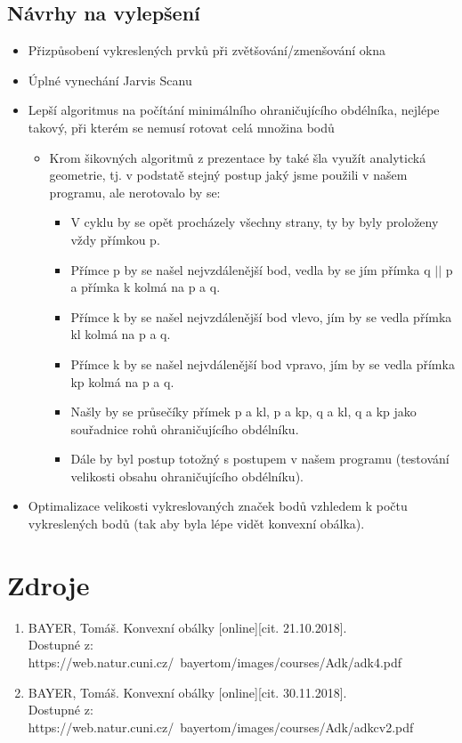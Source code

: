 \documentclass[a4paper, 12pt]{article}
\begin{document}
\subsection{Návrhy na vylepšení}
\begin{itemize}
	\item Přizpůsobení vykreslených prvků při zvětšování/zmenšování okna
	\item Úplné vynechání Jarvis Scanu
	\item Lepší algoritmus na počítání minimálního ohraničujícího obdélníka, nejlépe takový, při kterém se nemusí rotovat celá množina bodů
		\begin{itemize}
			\item Krom šikovných algoritmů z prezentace by také šla využít analytická geometrie, tj. v podstatě stejný postup jaký jsme použili v našem programu, ale nerotovalo by se:
				\begin{itemize}
					\item V cyklu by se opět procházely všechny strany, ty by byly proloženy vždy přímkou p. 
					\item Přímce p by se našel nejvzdálenější bod, vedla by se jím přímka q $||$ p a přímka k kolmá na p a q.
					\item Přímce k by se našel nejvzdálenější bod vlevo, jím by se vedla přímka kl kolmá na p a q.
					\item Přímce k by se našel nejvdálenější bod vpravo, jím by se vedla přímka kp kolmá na p a q.
					\item Našly by se průsečíky přímek p a kl, p a kp, q a kl, q a kp jako souřadnice rohů ohraničujícího obdélníku.
					\item Dále by byl postup totožný s postupem v našem programu (testování velikosti obsahu ohraničujícího obdélníku).
				\end{itemize}
		\end{itemize}
	\item Optimalizace velikosti vykreslovaných značek bodů vzhledem k počtu vykreslených bodů (tak aby byla lépe vidět konvexní obálka).
\end{itemize}

\clearpage
\section{Zdroje}

\begin{enumerate}
\item  BAYER, Tomáš. Konvexní obálky [online][cit. 21.10.2018]. \\
Dostupné z: https://web.natur.cuni.cz/~bayertom/images/courses/Adk/adk4.pdf  \\

\item  BAYER, Tomáš. Konvexní obálky [online][cit. 30.11.2018]. \\
Dostupné z: https://web.natur.cuni.cz/~bayertom/images/courses/Adk/adkcv2.pdf\\
\end{enumerate}
\end{document}
